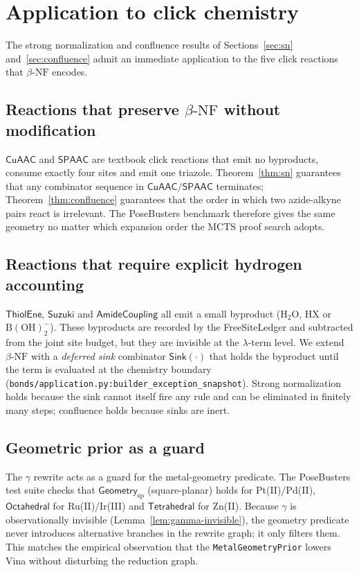 \documentclass{article}
\theoremstyle{definition}
\newcommand{\bnf}{\beta\text{-NF}}
\begin{document}
\section{Application to click chemistry}
\label{sec:click}
The strong normalization and confluence results of Sections~\ref{sec:sn}
and~\ref{sec:confluence} admit an immediate application to the
five click reactions that $\bnf$ encodes.

\subsection{Reactions that preserve $\bnf$ without modification}
$\mathsf{CuAAC}$ and $\mathsf{SPAAC}$ are textbook click reactions that
emit no byproducts, consume exactly four sites and emit one triazole.
Theorem~\ref{thm:sn} guarantees that any combinator sequence in
$\mathsf{CuAAC}/\mathsf{SPAAC}$ terminates; Theorem~\ref{thm:confluence}
guarantees that the order in which two azide-alkyne pairs react is
irrelevant. The PoseBusters benchmark therefore gives the same geometry
no matter which expansion order the MCTS proof search adopts.

\subsection{Reactions that require explicit hydrogen accounting}
$\mathsf{ThiolEne}$, $\mathsf{Suzuki}$ and $\mathsf{AmideCoupling}$ all
emit a small byproduct (\ensuremath{\mathrm{H_2O}}, \ensuremath{\mathrm{HX}} or \ensuremath{\mathrm{B(OH)_2^{-}}}). These
byproducts are recorded by the FreeSiteLedger and subtracted from the
joint site budget, but they are invisible at the $\lambda$-term level. We
extend $\bnf$ with a \emph{deferred sink} combinator $\mathsf{Sink}(\cdot)$
that holds the byproduct until the term is evaluated at the chemistry
boundary (\texttt{bonds/application.py:builder\_exception\_snapshot}).
Strong normalization holds because the sink cannot itself fire any rule
and can be eliminated in finitely many steps; confluence holds because
sinks are inert.

\subsection{Geometric prior as a guard}
The $\gamma$ rewrite acts as a guard for the metal-geometry predicate. The
PoseBusters test suite checks that $\mathsf{Geometry}_{\mathrm{sp}}$
(square-planar) holds for Pt(II)/Pd(II), $\mathsf{Octahedral}$ for
Ru(II)/Ir(III) and $\mathsf{Tetrahedral}$ for Zn(II). Because $\gamma$ is
observationally invisible (Lemma~\ref{lem:gamma-invisible}), the geometry
predicate never introduces alternative branches in the rewrite graph; it
only filters them. This matches the empirical observation that the
\texttt{MetalGeometryPrior} lowers Vina without disturbing the
reduction graph.
\end{document}
